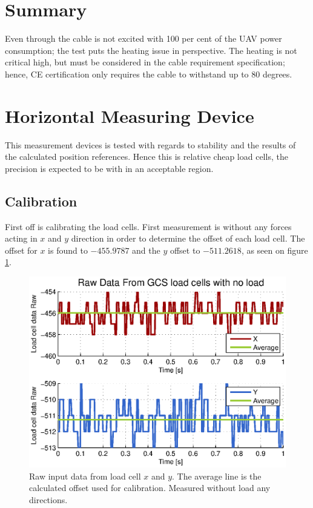 \section{Summary}
Even through the cable is not excited with 100 per cent of the UAV power consumption; the test puts the heating issue in perspective. The heating is not critical high, but must be considered in the cable requirement specification; hence, CE certification only requires the cable to withstand up to 80 degrees\cite{Parliament2006}.    



\section{Horizontal Measuring Device}
This measurement devices is tested with regards to stability and the results of the calculated position references. Hence this is relative cheap load cells, the precision is expected to be with in an acceptable region.

\subsection{Calibration}
First off is calibrating the load cells. First measurement is without any forces acting in $x$ and $y$ direction in order to determine the offset of each load cell.
The offset for $x$ is found to $-455.9787$ and the $y$ offset to $-511.2618$, as seen on figure \ref{fig:HMDcalib}.\\

\begin{figure}[hbtp]
\centering
\includegraphics[scale=1]{graphics/gcs_test/calib_0_data_raw.eps}
\caption[Raw data from load cell]{Raw input data from load cell $x$ and $y$. The average line is the calculated offset used for calibration. Measured without load any directions.}
\label{fig:HMDcalib}
\end{figure}

